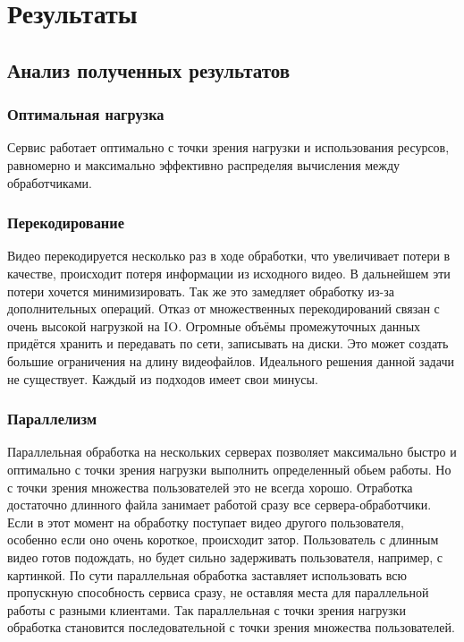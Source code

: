 \section{Результаты}

\subsection{Анализ полученных результатов}

\subsubsection*{Оптимальная нагрузка}

Сервис работает оптимально с точки зрения нагрузки и использования ресурсов, равномерно и максимально эффективно распределяя вычисления между обработчиками.


\subsubsection*{Перекодирование}

Видео перекодируется несколько раз в ходе обработки, что увеличивает потери в качестве, происходит потеря информации из исходного видео. В дальнейшем эти потери хочется минимизировать. Так же это замедляет обработку из-за дополнительных операций. Отказ от множественных перекодирований связан с очень высокой нагрузкой на IO. Огромные объёмы промежуточных данных придётся хранить и передавать по сети, записывать на диски. Это может создать большие ограничения на длину видеофайлов. Идеального решения данной задачи не существует. Каждый из подходов имеет свои минусы.


\subsubsection*{Параллелизм}

Параллельная обработка на нескольких серверах позволяет максимально быстро и оптимально с точки зрения нагрузки выполнить определенный обьем работы. Но с точки зрения множества пользователей это не всегда хорошо. Отработка достаточно длинного файла занимает работой сразу все сервера-обработчики. Если в этот момент на обработку поступает видео другого пользователя, особенно если оно очень короткое, происходит затор. Пользователь с длинным видео готов подождать, но будет сильно задерживать пользователя, например, с картинкой. По сути параллельная обработка заставляет использовать всю пропускную способность сервиса сразу, не оставляя места для параллельной работы с разными клиентами. Так параллельная с точки зрения нагрузки обработка становится последовательной с точки зрения множества пользователей.

